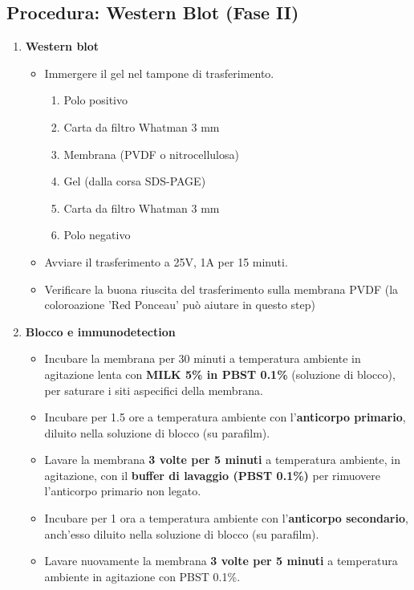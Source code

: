 \subsection{Procedura: Western Blot (Fase II)}
\begin{enumerate}
\item \textbf{Western blot}
    \begin{itemize}
      \item Immergere il gel nel tampone di trasferimento.
      \begin{enumerate}
        \item Polo positivo
        \item Carta da filtro Whatman 3 mm
        \item Membrana (PVDF o nitrocellulosa)
        \item Gel (dalla corsa SDS-PAGE)
        \item Carta da filtro Whatman 3 mm
        \item Polo negativo
      \end{enumerate}
      \item Avviare il trasferimento a 25V, 1A per 15 minuti.
      \item Verificare la buona riuscita del trasferimento sulla membrana PVDF (la coloroazione 'Red Ponceau' può aiutare in questo step)
    \end{itemize}



  
\item \footnotesize\textbf{Blocco e immunodetection}
  \begin{itemize}
    \item Incubare la membrana per 30 minuti a temperatura ambiente in agitazione lenta con \textbf{MILK 5\% in PBST 0.1\%} (soluzione di blocco), per saturare i siti aspecifici della membrana.
    \item Incubare per 1.5 ore a temperatura ambiente con l’\textbf{anticorpo primario}, diluito nella soluzione di blocco (su parafilm).
    \item Lavare la membrana \textbf{3 volte per 5 minuti} a temperatura ambiente, in agitazione, con il \textbf{buffer di lavaggio (PBST 0.1\%)} per rimuovere l’anticorpo primario non legato.
    \item Incubare per 1 ora a temperatura ambiente con l’\textbf{anticorpo secondario}, anch’esso diluito nella soluzione di blocco (su parafilm).
    \item Lavare nuovamente la membrana \textbf{3 volte per 5 minuti} a temperatura ambiente in agitazione con PBST 0.1\%.
  \end{itemize}
\end{enumerate}

